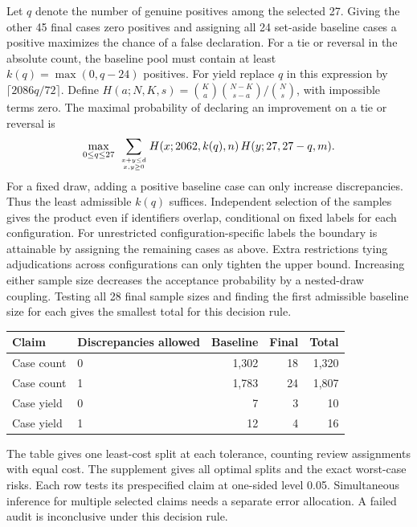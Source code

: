 \documentclass[11pt]{article}
\begin{document}
Let $q$ denote the number of genuine positives among the selected 27. Giving the other 45 final cases zero positives and assigning all 24 set-aside baseline cases a positive maximizes the chance of a false declaration. For a tie or reversal in the absolute count, the baseline pool must contain at least $k(q)=\max(0,q-24)$ positives. For yield replace $q$ in this expression by $\lceil 2086q/72\rceil$. Define $H(a;N,K,s)=\binom Ka\binom{N-K}{s-a}/\binom Ns$, with impossible terms zero. The maximal probability of declaring an improvement on a tie or reversal is
\[
 \max_{0\le q\le27}\ \sum_{x+y\le d\atop x,y\ge0}
 H(x;2062,k(q),n)\,H(y;27,27-q,m).
\]
For a fixed draw, adding a positive baseline case can only increase discrepancies. Thus the least admissible $k(q)$ suffices. Independent selection of the samples gives the product even if identifiers overlap, conditional on fixed labels for each configuration. For unrestricted configuration-specific labels the boundary is attainable by assigning the remaining cases as above. Extra restrictions tying adjudications across configurations can only tighten the upper bound. Increasing either sample size decreases the acceptance probability by a nested-draw coupling. Testing all 28 final sample sizes and finding the first admissible baseline size for each gives the smallest total for this decision rule.

\begin{center}\small
\begin{tabular}{llrrr}\toprule
Claim & Discrepancies allowed & Baseline & Final & Total\\\midrule
Case count & 0 & 1,302 & 18 & 1,320\\
Case count & 1 & 1,783 & 24 & 1,807\\
Case yield & 0 & 7 & 3 & 10\\
Case yield & 1 & 12 & 4 & 16\\
\bottomrule\end{tabular}\end{center}
The table gives one least-cost split at each tolerance, counting review assignments with equal cost. The supplement gives all optimal splits and the exact worst-case risks. Each row tests its prespecified claim at one-sided level 0.05. Simultaneous inference for multiple selected claims needs a separate error allocation. A failed audit is inconclusive under this decision rule.
\end{document}

